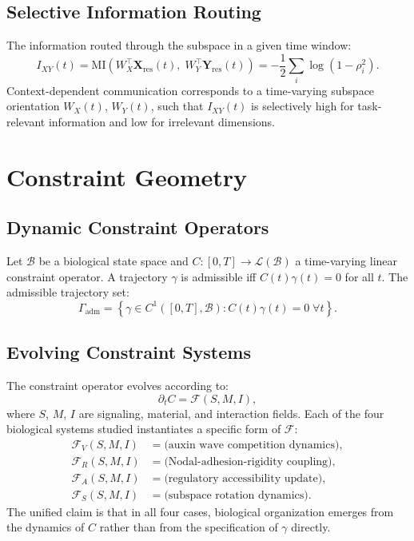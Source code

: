 \documentclass[12pt, a4paper, openany]{book}
\theoremstyle{definition}
\theoremstyle{remark}
\begin{document}
\begin{appendices}
\section{Selective Information Routing}

The information routed through the subspace in a given time window:
\begin{equation}
I_{XY}(t) = \mathrm{MI}\!\left(W_X^\top \mathbf{X}_{\text{res}}(t),\; W_Y^\top \mathbf{Y}_{\text{res}}(t)\right) = -\frac{1}{2}\sum_i \log(1-\rho_i^2).
\end{equation}
Context-dependent communication corresponds to a time-varying subspace orientation $W_X(t)$, $W_Y(t)$, such that $I_{XY}(t)$ is selectively high for task-relevant information and low for irrelevant dimensions.

\chapter{Constraint Geometry}

\section{Dynamic Constraint Operators}

Let $\mathcal{B}$ be a biological state space and $C : [0,T] \to \mathcal{L}(\mathcal{B})$ a time-varying linear constraint operator. A trajectory $\gamma$ is admissible iff $C(t)\gamma(t) = 0$ for all $t$. The admissible trajectory set:
\begin{equation}
\Gamma_{\text{adm}} = \left\{ \gamma \in C^1([0,T],\mathcal{B}) : C(t)\gamma(t) = 0 \;\forall t \right\}.
\end{equation}

\section{Evolving Constraint Systems}

The constraint operator evolves according to:
\begin{equation}
\partial_t C = \mathcal{F}(S, M, I),
\end{equation}
where $S$, $M$, $I$ are signaling, material, and interaction fields. Each of the four biological systems studied instantiates a specific form of $\mathcal{F}$:
\begin{align}
\mathcal{F}_V(S,M,I) &= \text{(auxin wave competition dynamics)}, \\
\mathcal{F}_R(S,M,I) &= \text{(Nodal-adhesion-rigidity coupling)}, \\
\mathcal{F}_A(S,M,I) &= \text{(regulatory accessibility update)}, \\
\mathcal{F}_S(S,M,I) &= \text{(subspace rotation dynamics)}.
\end{align}
The unified claim is that in all four cases, biological organization emerges from the dynamics of $C$ rather than from the specification of $\gamma$ directly.


\end{appendices}
\end{document}
